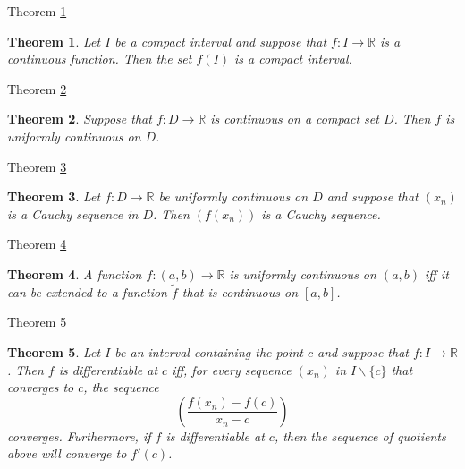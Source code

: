 \documentclass[avery5371,grid]{flashcards}
\newtheorem{theorem}{Theorem}
\newcommand{\bb}[1]{\mathbb{#1}}
\newcommand{\R}{\bb{R}}
\begin{document}
\begin{flashcard}[Theorem]{Theorem \ref{thm75}}
\begin{theorem}
\label{thm75}
Let $I$ be a compact interval and suppose that $f: I \to \R$ is a
continuous function.  Then the set $f(I)$ is a compact interval.
\end{theorem}
\end{flashcard}

\begin{flashcard}[Theorem]{Theorem \ref{thm76}}
\begin{theorem}
\label{thm76}
Suppose that $f: D \to \R$ is continuous on a compact set $D$.  Then
$f$ is uniformly continuous on $D$.
\end{theorem}
\end{flashcard}

\begin{flashcard}[Theorem]{Theorem \ref{thm77}}
\begin{theorem}
\label{thm77}
Let $f: D \to \R$ be uniformly continuous on $D$ and suppose that
$(x_n)$ is a Cauchy sequence in $D$.  Then $(f(x_n))$ is a Cauchy
sequence.
\end{theorem}
\end{flashcard}

\begin{flashcard}[Theorem]{Theorem \ref{thm78}}
\begin{theorem}
\label{thm78}
A function $f: (a,b) \to \R$ is uniformly continuous on $(a,b)$ iff it
can be extended to a function $\tilde{f}$ that is continuous on $[a,b]$.
\end{theorem}
\end{flashcard}

\begin{flashcard}[Theorem]{Theorem \ref{thm79}}
\begin{theorem}
\label{thm79}
Let $I$ be an interval containing the point $c$ and suppose that $f: I \to \R$.  Then $f$ is differentiable at $c$ iff, for every sequence $(x_n)$ in $I \smallsetminus \{ c\}$ that converges to $c$, the sequence
$$\displaystyle \left( \frac{f(x_n) - f(c)}{x_n-c} \right)$$
converges.  Furthermore, if $f$ is differentiable at $c$, then the sequence of quotients above will converge to $f'(c)$.
\end{theorem}
\end{flashcard}
\end{document}
